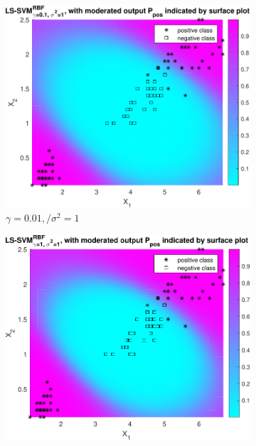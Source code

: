 \documentclass{article}
\begin{document}
            \begin{figure}[h]
                 \centering
                 \begin{subfigure}[b]{0.3\textwidth}
                     \centering
                     \includegraphics[width=\textwidth]{Assignment 1/figures/bayes_rbf_gamma_1.000000e-01_sig2_1.pdf}
                    \caption{$\gamma =0.01,/ \sigma^2 = 1$}
                     \label{fig:bayes_4}
                 \end{subfigure}
                 \hfill
                 \begin{subfigure}[b]{0.3\textwidth}
                     \centering
                     \includegraphics[width=\textwidth]{Assignment 1/figures/bayes_rbf_gamma_1_sig2_1.pdf}

\end{subfigure}
\end{figure}
\end{document}
